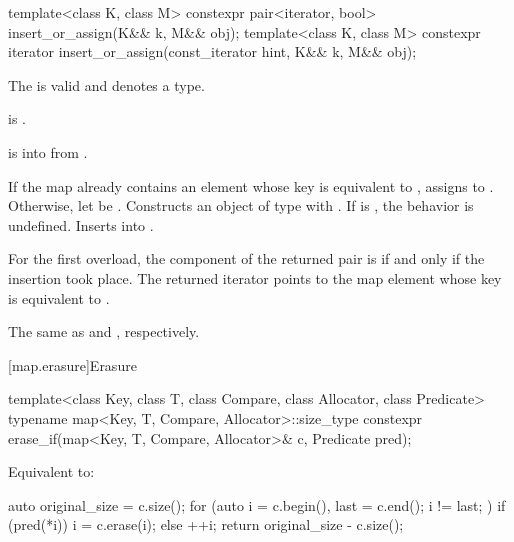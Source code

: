 %
\begin{itemdecl}
template<class K, class M>
  constexpr pair<iterator, bool> insert_or_assign(K&& k, M&& obj);
template<class K, class M>
  constexpr iterator insert_or_assign(const_iterator hint, K&& k, M&& obj);
\end{itemdecl}

\begin{itemdescr}
\pnum
\constraints
The  
is valid and denotes a type.

\pnum
\mandates
{} is .

\pnum
\expects
{} is  into  from
.

\pnum
\effects
If the map already contains an element 
whose key is equivalent to ,
assigns  to .
Otherwise, let  be .
Constructs an object  of type 
with .
If  is ,
the behavior is undefined.
Inserts  into .

\pnum
\returns
For the first overload,
the  component of the returned pair is 
if and only if the insertion took place.
The returned iterator points to the map element
whose key is equivalent to .

\pnum
\complexity
The same as  and , respectively.
\end{itemdescr}

[map.erasure]{Erasure}

%
\begin{itemdecl}
template<class Key, class T, class Compare, class Allocator, class Predicate>
  typename map<Key, T, Compare, Allocator>::size_type
    constexpr erase_if(map<Key, T, Compare, Allocator>& c, Predicate pred);
\end{itemdecl}

\begin{itemdescr}
\pnum
\effects
Equivalent to:
\begin{codeblock}
auto original_size = c.size();
for (auto i = c.begin(), last = c.end(); i != last; ) {
  if (pred(*i)) {
    i = c.erase(i);
  } else {
    ++i;
  }
}
return original_size - c.size();
\end{codeblock}
\end{itemdescr}

